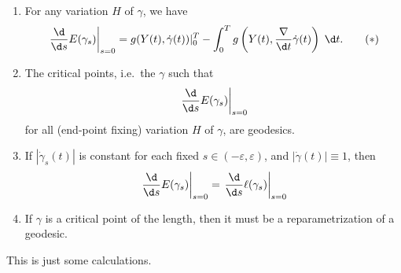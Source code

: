 \documentclass[a4paper]{article}
\begin{document}
\begin{thm}\leavevmode
  \begin{enumerate}
    \item For any variation $H$ of $\gamma$, we have
      \[
        \left.\frac{\d}{\d s}E(\gamma_s)\right|_{s = 0} = g(Y(t), \dot{\gamma}(t))|_0^T - \int_0^T g\left(Y(t), \frac{\nabla}{\d t} \dot{\gamma}(t)\right)\;\d t.\tag{$*$}
      \]
    \item The critical points, i.e.\ the $\gamma$ such that
      \[
        \left.\frac{\d}{\d s} E(\gamma_s)\right|_{s = 0}
      \]
      for all (end-point fixing) variation $H$ of $\gamma$, are geodesics.
    \item If $|\dot{\gamma}_s(t)|$ is constant for each fixed $s \in (-\varepsilon, \varepsilon)$, and $|\dot{\gamma}(t)| \equiv 1$, then
      \[
        \left.\frac{\d}{\d s}E(\gamma_s) \right|_{s = 0} = \left.\frac{\d}{\d s} \ell(\gamma_s)\right|_{s = 0}
      \]
    \item If $\gamma$ is a critical point of the length, then it must be a reparametrization of a geodesic.
  \end{enumerate}
\end{thm}
This is just some calculations.
\end{document}
